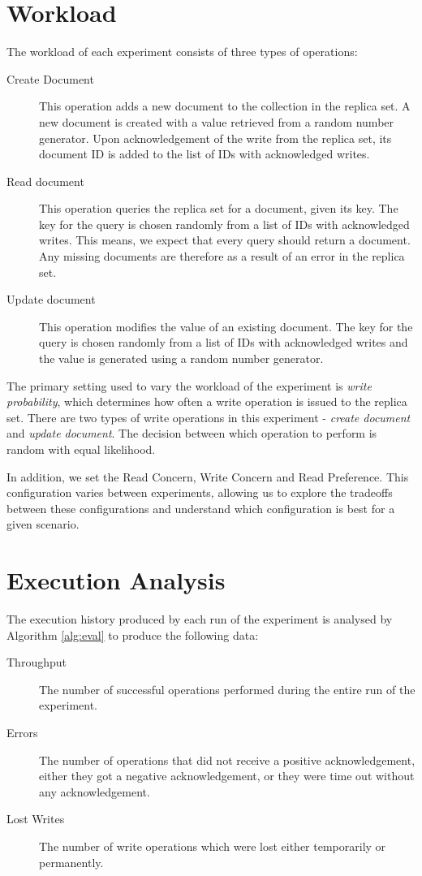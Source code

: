 \section{Workload}
The workload of each experiment consists of three types of operations:

\begin{description}
    \item[Create Document] This operation adds a new document to the collection in the replica set. A new document is created with a value retrieved from a random number generator. Upon acknowledgement of the write from the replica set, its document ID is added to the list of IDs with acknowledged writes.
    \item[Read document] This operation queries the replica set for a document, given its key. The key for the query is chosen randomly from a list of IDs with acknowledged writes. This means, we expect that every query should return a document. Any missing documents are therefore as a result of an error in the replica set.
    \item[Update document] This operation modifies the value of an existing document. The key for the query is chosen randomly from a list of IDs with acknowledged writes and the value is generated using a random number generator.
\end{description}

The primary setting used to vary the workload of the experiment is \textit{write probability}, which determines how often a write operation is issued to the replica set. There are two types of write operations in this experiment - \textit{create document} and \textit{update document}. The decision between which operation to perform is random with equal likelihood.

In addition, we set the Read Concern, Write Concern and Read Preference. This configuration varies between experiments, allowing us to explore the tradeoffs between these configurations and understand which configuration is best for a given scenario.

\section{Execution Analysis}
The execution history produced by each run of the experiment is analysed by Algorithm \ref{alg:eval} to produce the following data:
\begin{description}
    \item[Throughput] The number of successful operations performed during the entire run of the experiment.
    \item[Errors] The number of operations that did not receive a positive acknowledgement, either they got a negative acknowledgement, or they were time out without any acknowledgement.
    \item[Lost Writes] The number of write operations which were lost either temporarily or permanently.
\end{description}

